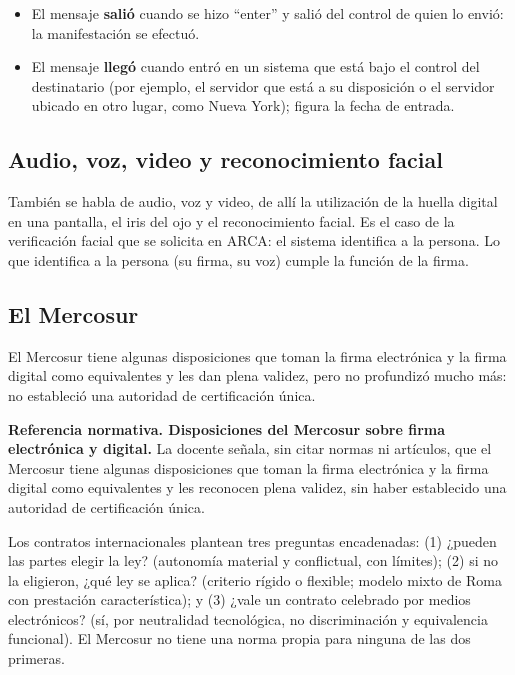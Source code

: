 \documentclass[12pt,oneside]{book}
\begin{document}
\begin{itemize}
    \item El mensaje \textbf{salió} cuando se hizo ``enter'' y salió del control de quien lo envió: la manifestación se efectuó.
    \item El mensaje \textbf{llegó} cuando entró en un sistema que está bajo el control del destinatario (por ejemplo, el servidor que está a su disposición o el servidor ubicado en otro lugar, como Nueva York); figura la fecha de entrada.
\end{itemize}

\subsection{Audio, voz, video y reconocimiento facial}

También se habla de audio, voz y video, de allí la utilización de la huella digital en una pantalla, el iris del ojo y el reconocimiento facial. Es el caso de la verificación facial que se solicita en ARCA: el sistema identifica a la persona. Lo que identifica a la persona (su firma, su voz) cumple la función de la firma.

\subsection{El Mercosur}

El Mercosur tiene algunas disposiciones que toman la firma electrónica y la firma digital como equivalentes y les dan plena validez, pero no profundizó mucho más: no estableció una autoridad de certificación única.

\begin{note}
\textbf{Referencia normativa. Disposiciones del Mercosur sobre firma electrónica y digital.} La docente señala, sin citar normas ni artículos, que el Mercosur tiene algunas disposiciones que toman la firma electrónica y la firma digital como equivalentes y les reconocen plena validez, sin haber establecido una autoridad de certificación única.
\end{note}

\begin{important}
Los contratos internacionales plantean tres preguntas encadenadas: (1) ¿pueden las partes elegir la ley? (autonomía material y conflictual, con límites); (2) si no la eligieron, ¿qué ley se aplica? (criterio rígido o flexible; modelo mixto de Roma con prestación característica); y (3) ¿vale un contrato celebrado por medios electrónicos? (sí, por neutralidad tecnológica, no discriminación y equivalencia funcional). El Mercosur no tiene una norma propia para ninguna de las dos primeras.
\end{important}
\end{document}
